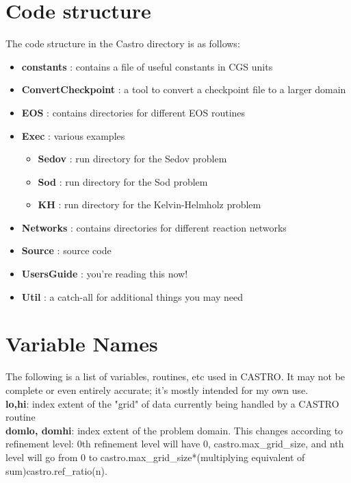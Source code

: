 \section{Code structure}

The code structure in the Castro directory is as follows:

\begin{itemize}
    \item {\bf constants}      : contains a file of useful constants in CGS units
    \item {\bf ConvertCheckpoint} : a tool to convert a checkpoint file to a larger domain
    \item {\bf EOS}            : contains directories for different EOS routines
    \item {\bf Exec}       : various examples
    \begin{itemize}
      \item {\bf Sedov}        : run directory for the Sedov problem
      \item {\bf Sod}          : run directory for the Sod problem
      \item {\bf KH}           : run directory for the Kelvin-Helmholz problem
    \end{itemize}
    \item {\bf Networks}       : contains directories for different reaction networks
    \item {\bf Source}     : source code
    \item {\bf UsersGuide} : you're reading this now!
    \item {\bf Util}       : a catch-all for additional things you may need 
\end{itemize}

\section{Variable Names}

The following is a list of variables, routines, etc used in CASTRO. It may not be complete or even entirely accurate; it's mostly intended for my own use.\\

{\bf lo,hi}: index extent of the "grid" of data currently being handled by a CASTRO routine\\

{\bf domlo, domhi}: index extent of the problem domain. This changes according to refinement level: 0th refinement level will have 0, castro.max\_grid\_size, and nth level will go from 0 to castro.max\_grid\_size*(multiplying equivalent of sum)castro.ref\_ratio(n).\\

